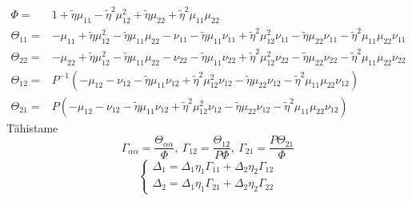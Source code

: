 \documentclass[class=article, crop=false]{standalone}
\begin{document}
\begin{equation}\label{key}
	\begin{split}
		\Phi = & 1 + \tilde{ \eta} \mu_{11} - \tilde{ \eta}^{2} \mu_{12}^{2} + \tilde{ \eta} \mu_{22} + \tilde{ \eta}^{2} \mu_{11} \mu_{22} \\
		\Theta_{11} = & - \mu_{11} + \tilde{ \eta} \mu_{12}^{2} - \tilde{ \eta} \mu_{11} \mu_{22} - \nu_{11} - \tilde{ \eta} \mu_{11} \nu_{11} + \tilde{ \eta}^{2} \mu_{12}^{2} \nu_{11} - \tilde{ \eta} \mu_{22} \nu_{11} - \tilde{ \eta}^{2} \mu_{11} \mu_{22} \nu_{11} \\
		\Theta_{22} = & - \mu_{22} + \tilde{ \eta} \mu_{12}^{2} - \tilde{ \eta} \mu_{11} \mu_{22} - \nu_{22} - \tilde{ \eta} \mu_{11} \nu_{22} + \tilde{ \eta}^{2} \mu_{12}^{2} \nu_{22} - \tilde{ \eta} \mu_{22} \nu_{22} - \tilde{ \eta}^{2} \mu_{11} \mu_{22} \nu_{22} \\
		\Theta_{12} = & P^{-1} \left(- \mu_{12} - \nu_{12} - \tilde{ \eta} \mu_{11} \nu_{12} + \tilde{ \eta}^{2} \mu_{12}^{2} \nu_{12} - \tilde{ \eta} \mu_{22} \nu_{12} - \tilde{ \eta}^{2} \mu_{11} \mu_{22} \nu_{12} \right) \\
		\Theta_{21} = & P \left(- \mu_{12} - \nu_{12} - \tilde{ \eta} \mu_{11} \nu_{12} + \tilde{ \eta}^{2} \mu_{12}^{2} \nu_{12} - \tilde{ \eta} \mu_{22} \nu_{12} - \tilde{ \eta}^{2} \mu_{11} \mu_{22} \nu_{12} \right)
	\end{split}
\end{equation}
Tähistame
\begin{equation}\label{key}
	\Gamma_{ \alpha \alpha} = \frac{ \Theta_{ \alpha \alpha}}{ \Phi},\ \Gamma_{12} = \frac{ \Theta_{12}}{P \Phi},\ \Gamma_{21} = \frac{P \Theta_{21}}{ \Phi}
\end{equation}
\begin{equation}\label{PiluVorrandiSusteemGamma}
	\begin{cases}
		\Delta_{1} = \Delta_{1} \eta_{ 1} \Gamma_{11} + \Delta_{2} \eta_{ 2} \Gamma_{12} \\
		\Delta_{2} = \Delta_{1} \eta_{ 1} \Gamma_{21} + \Delta_{2} \eta_{ 2} \Gamma_{22}
	\end{cases}
\end{equation}
\end{document}
